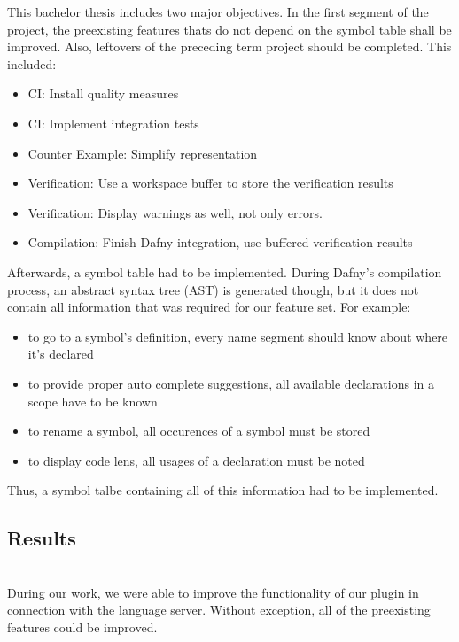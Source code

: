 This bachelor thesis includes two major objectives.
In the first segment of the project, the preexisting features thats do not depend on the symbol table shall be improved.
Also, leftovers of the preceding term project should be completed.
This included:
\begin{itemize}
    \item CI: Install quality measures
    \item CI: Implement integration tests
    \item Counter Example: Simplify representation
    \item Verification: Use a workspace buffer to store the verification results
    \item Verification: Display warnings as well, not only errors.
    \item Compilation: Finish Dafny integration, use buffered verification results
\end{itemize}
Afterwards, a symbol table had to be implemented.
During Dafny's compilation process, an abstract syntax tree (AST) is generated though, but it does not contain all information that was required for our feature set.
For example:
\begin{itemize}
    \item to go to a symbol's definition, every name segment should know about where it's declared
    \item to provide proper auto complete suggestions, all available declarations in a scope have to be known
    \item to rename a symbol, all occurences of a symbol must be stored
    \item to display code lens, all usages of a declaration must be noted
\end{itemize}
Thus, a symbol talbe containing all of this information had to be implemented.

\subsection{Results}
\\

During our work, we were able to improve the functionality of our plugin in connection with the language server.
Without exception, all of the preexisting features could be improved.\\

